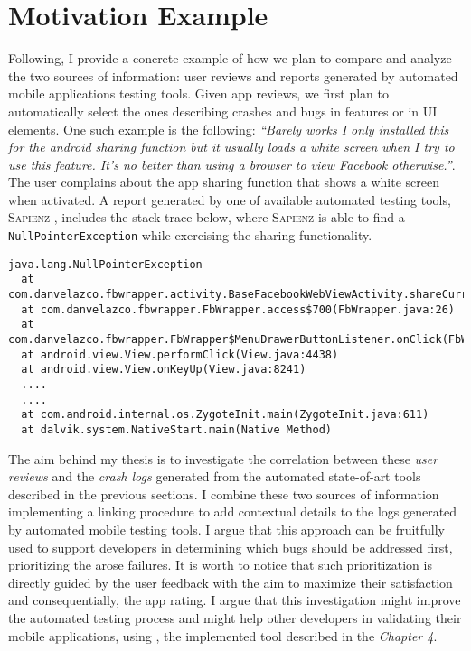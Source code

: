 \section{Motivation Example}
Following, I provide a concrete example of how we plan to compare and analyze the two sources of information: user reviews and reports generated by automated mobile applications testing tools. Given app reviews, we first plan to automatically select the ones describing crashes and bugs in features or in UI elements.
One such example is the following: 
\smallbreak
\emph{\small``Barely works I only installed this for the android sharing function but it usually loads a white screen when I try to use this feature. It's no better than using a browser to view Facebook otherwise.''}. 
\smallbreak
The user complains about the app sharing function that shows a white screen when activated. A report generated by one of available automated testing tools, \textsc{Sapienz} \cite{sapienz}, includes the stack trace below, where \textsc{Sapienz} is able to find a \texttt{NullPointerException} while exercising the sharing functionality. 
\begin{lstlisting}[basicstyle=\fontsize{6}{8}\ttfamily]
java.lang.NullPointerException
  at com.danvelazco.fbwrapper.activity.BaseFacebookWebViewActivity.shareCurrentPage(BaseFacebookWebViewActivity.java:418)
  at com.danvelazco.fbwrapper.FbWrapper.access$700(FbWrapper.java:26)
  at com.danvelazco.fbwrapper.FbWrapper$MenuDrawerButtonListener.onClick(FbWrapper.java:376)
  at android.view.View.performClick(View.java:4438)
  at android.view.View.onKeyUp(View.java:8241)
  ....
  ....
  at com.android.internal.os.ZygoteInit.main(ZygoteInit.java:611)
  at dalvik.system.NativeStart.main(Native Method)
\end{lstlisting}

The aim behind my thesis is to investigate the correlation between these \textit{user reviews} and the \textit{crash logs} generated from the automated state-of-art tools described in the previous sections. 
I combine these two sources of information implementing a linking procedure to add contextual details to the logs generated by automated mobile testing tools. I argue that this approach can be fruitfully used to support developers in determining which bugs should be addressed first, prioritizing the arose failures. It is worth to notice that such prioritization is directly guided by the user feedback with the aim to maximize their satisfaction and consequentially, the app rating.
I argue that this investigation might improve the automated testing process and might help other developers in validating their mobile applications, using \toolname, the implemented tool described in the \textit{Chapter 4}.




